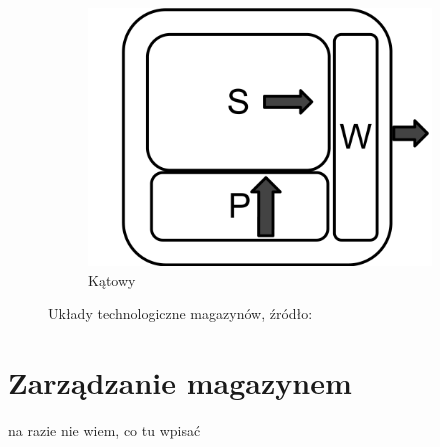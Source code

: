 \begin{figure}[h]
        	\quad
			\begin{subfigure}[b]{0.3\textwidth}
                \centering
                \includegraphics[width=\textwidth]{images/katowy_magazyn}
                \caption{Kątowy}
                \label{fig:angle_warehouse}
        	\end{subfigure}
        	\caption[Układy technologiczne magazynów]{
				Układy technologiczne magazynów, źródło: \cite{PL_FM}        	
        	}
		\end{figure}
	
\section{Zarządzanie magazynem}
	na razie nie wiem, co tu wpisać
